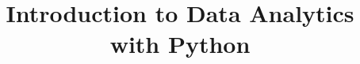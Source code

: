 \documentclass[xcolor=dvipsnames,compress,t,pdf,notes,9pt]{beamer}
\title[\insertframenumber /\inserttotalframenumber]{Introduction to Data Analytics with Python}
\begin{document}
	\begin{frame}
	\titlepage
	\end{frame}
	
%	
	
	
\end{document}
